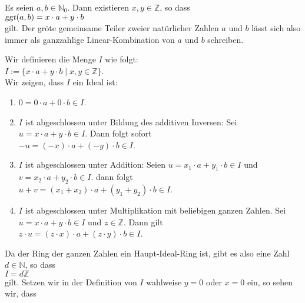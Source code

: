 \begin{Satz}
\label{satz:bezout}
  Es seien $a,b \in \mathbb{N}_0$.  Dann existieren $x,y \in \mathbb{Z}$, so dass
  \\[0.2cm]
  \hspace*{1.3cm}
  $\textsl{ggt}(a,b) = x \cdot a + y \cdot b$
  \\[0.2cm]
  gilt.  Der gr\"{o}\3te gemeinsame Teiler zweier nat\"{u}rlicher Zahlen $a$ und $b$ 
  l\"{a}sst sich also immer als ganzzahlige Linear-Kombination von $a$ und $b$ schreiben.
\end{Satz}

\proof
Wir definieren die Menge $I$ wie folgt:
\\[0.2cm]
\hspace*{1.3cm}
$I := \bigl\{ x \cdot a + y \cdot b \mid x,y \in \mathbb{Z} \bigr\}$.
\\[0.2cm]
Wir zeigen, dass $I$ ein Ideal ist:
\begin{enumerate}
\item $0 = 0 \cdot a + 0 \cdot b \in I$.
\item $I$ ist abgeschlossen unter Bildung des additiven Inversen:  Sei
      $u = x \cdot a + y \cdot b \in I$.  Dann folgt sofort
      \\[0.2cm]
      \hspace*{1.3cm}
      $-u = (-x) \cdot a + (-y) \cdot b \in I$.
\item $I$ ist abgeschlossen unter Addition: Seien  
      $u = x_1 \cdot a + y_1 \cdot b \in I$ und $v = x_2 \cdot a + y_2 \cdot b \in I$.
      dann folgt
      \\[0.2cm]
      \hspace*{1.3cm}
      $u + v = (x_1 + x_2) \cdot a + (y_1 + y_2) \cdot b \in I$.
\item $I$ ist abgeschlossen unter Multiplikation mit beliebigen ganzen Zahlen.  
      Sei $u = x \cdot a + y \cdot b \in I$ und $z \in \mathbb{Z}$.  Dann gilt
      \\[0.2cm]
      \hspace*{1.3cm}
      $z \cdot u = (z \cdot x) \cdot a + (z \cdot y) \cdot b \in I$.
\end{enumerate}
Da der Ring der ganzen Zahlen ein Haupt-Ideal-Ring ist, gibt es also eine Zahl $d \in \mathbb{N}$, 
so dass
\\[0.2cm]
\hspace*{1.3cm}
$I = d\mathbb{Z}$
\\[0.2cm]
gilt.  Setzen wir in der Definition von $I$ wahlweise $y = 0$ oder $x = 0$ ein, so sehen wir, dass
